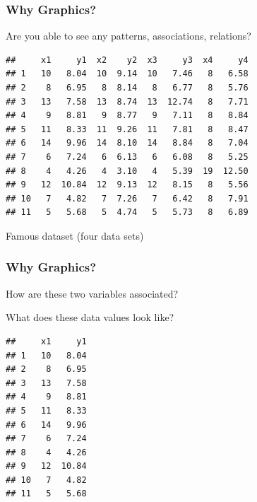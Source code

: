 \documentclass[12pt]{beamer}\usepackage[]{graphicx}\usepackage[]{color}
\makeatletter
\newenvironment{kframe}{%
 \def\at@end@of@kframe{}%
 \ifinner\ifhmode%
  \def\at@end@of@kframe{\end{minipage}}%
  \begin{minipage}{\columnwidth}%
 \fi\fi%
 \def\FrameCommand##1{\hskip\@totalleftmargin \hskip-\fboxsep
 \colorbox{shadecolor}{##1}\hskip-\fboxsep
     \hskip-\linewidth \hskip-\@totalleftmargin \hskip\columnwidth}%
 \MakeFramed {\advance\hsize-\width
   \@totalleftmargin\z@ \linewidth\hsize
   \@setminipage}}%
 {\par\unskip\endMakeFramed%
 \at@end@of@kframe}
\newenvironment{knitrout}{}{} %
\makeatother
\begin{document}

\begin{frame}[fragile]
\frametitle{Why Graphics?}

Are you able to see any patterns, associations, relations?
\begin{knitrout}\scriptsize
{}\color{fgcolor}\begin{kframe}
\begin{verbatim}
##     x1     y1  x2    y2  x3     y3  x4     y4
## 1   10   8.04  10  9.14  10   7.46   8   6.58
## 2    8   6.95   8  8.14   8   6.77   8   5.76
## 3   13   7.58  13  8.74  13  12.74   8   7.71
## 4    9   8.81   9  8.77   9   7.11   8   8.84
## 5   11   8.33  11  9.26  11   7.81   8   8.47
## 6   14   9.96  14  8.10  14   8.84   8   7.04
## 7    6   7.24   6  6.13   6   6.08   8   5.25
## 8    4   4.26   4  3.10   4   5.39  19  12.50
## 9   12  10.84  12  9.13  12   8.15   8   5.56
## 10   7   4.82   7  7.26   7   6.42   8   7.91
## 11   5   5.68   5  4.74   5   5.73   8   6.89
\end{verbatim}
\end{kframe}
\end{knitrout}

{\small Famous dataset  (four data sets)}
\end{frame}


\begin{frame}[fragile]
\frametitle{Why Graphics?}

How are these two variables associated?

\bigskip
What does these data values look like?
\begin{knitrout}\scriptsize
{}\color{fgcolor}\begin{kframe}
\begin{verbatim}
##     x1     y1
## 1   10   8.04
## 2    8   6.95
## 3   13   7.58
## 4    9   8.81
## 5   11   8.33
## 6   14   9.96
## 7    6   7.24
## 8    4   4.26
## 9   12  10.84
## 10   7   4.82
## 11   5   5.68
\end{verbatim}
\end{kframe}
\end{knitrout}

\end{frame}

\end{document}
